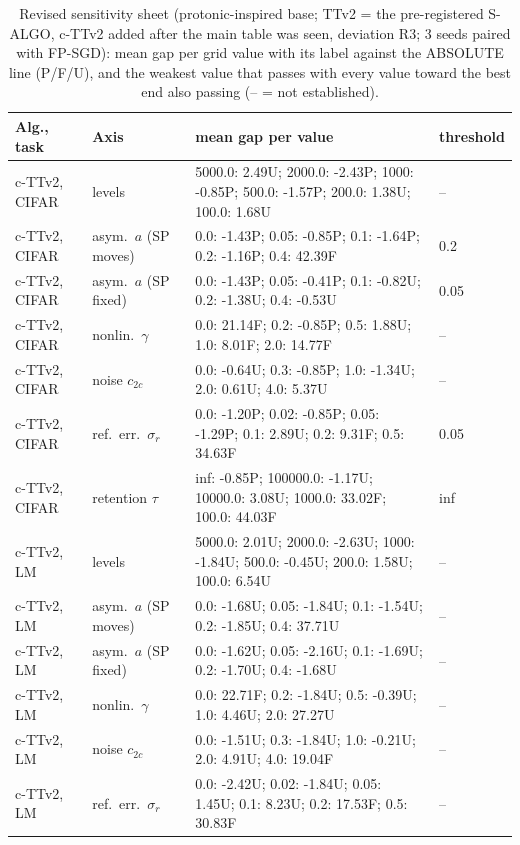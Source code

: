 \begin{table}[p]\centering\scriptsize\caption{Revised sensitivity sheet (protonic-inspired base; TTv2 = the pre-registered S-ALGO, c-TTv2 added after the main table was seen, deviation R3; 3 seeds paired with FP-SGD): mean gap per grid value with its label against the ABSOLUTE line (P/F/U), and the weakest value that passes with every value toward the best end also passing (-- = not established).}\label{tab:rev_spec}
\begin{tabular}{llp{8.8cm}l}\toprule Alg., task & Axis & mean gap per value & threshold\\\midrule
c-TTv2, CIFAR & levels & 5000.0: 2.49U; 2000.0: -2.43P; 1000: -0.85P; 500.0: -1.57P; 200.0: 1.38U; 100.0: 1.68U & --\\
c-TTv2, CIFAR & asym.\ $a$ (SP moves) & 0.0: -1.43P; 0.05: -0.85P; 0.1: -1.64P; 0.2: -1.16P; 0.4: 42.39F & 0.2\\
c-TTv2, CIFAR & asym.\ $a$ (SP fixed) & 0.0: -1.43P; 0.05: -0.41P; 0.1: -0.82U; 0.2: -1.38U; 0.4: -0.53U & 0.05\\
c-TTv2, CIFAR & nonlin.\ $\gamma$ & 0.0: 21.14F; 0.2: -0.85P; 0.5: 1.88U; 1.0: 8.01F; 2.0: 14.77F & --\\
c-TTv2, CIFAR & noise $c_{2c}$ & 0.0: -0.64U; 0.3: -0.85P; 1.0: -1.34U; 2.0: 0.61U; 4.0: 5.37U & --\\
c-TTv2, CIFAR & ref.\ err.\ $\sigma_r$ & 0.0: -1.20P; 0.02: -0.85P; 0.05: -1.29P; 0.1: 2.89U; 0.2: 9.31F; 0.5: 34.63F & 0.05\\
c-TTv2, CIFAR & retention $\tau$ & inf: -0.85P; 100000.0: -1.17U; 10000.0: 3.08U; 1000.0: 33.02F; 100.0: 44.03F & inf\\
c-TTv2, LM & levels & 5000.0: 2.01U; 2000.0: -2.63U; 1000: -1.84U; 500.0: -0.45U; 200.0: 1.58U; 100.0: 6.54U & --\\
c-TTv2, LM & asym.\ $a$ (SP moves) & 0.0: -1.68U; 0.05: -1.84U; 0.1: -1.54U; 0.2: -1.85U; 0.4: 37.71U & --\\
c-TTv2, LM & asym.\ $a$ (SP fixed) & 0.0: -1.62U; 0.05: -2.16U; 0.1: -1.69U; 0.2: -1.70U; 0.4: -1.68U & --\\
c-TTv2, LM & nonlin.\ $\gamma$ & 0.0: 22.71F; 0.2: -1.84U; 0.5: -0.39U; 1.0: 4.46U; 2.0: 27.27U & --\\
c-TTv2, LM & noise $c_{2c}$ & 0.0: -1.51U; 0.3: -1.84U; 1.0: -0.21U; 2.0: 4.91U; 4.0: 19.04F & --\\
c-TTv2, LM & ref.\ err.\ $\sigma_r$ & 0.0: -2.42U; 0.02: -1.84U; 0.05: 1.45U; 0.1: 8.23U; 0.2: 17.53F; 0.5: 30.83F & --\\

\end{tabular}
\end{table}
